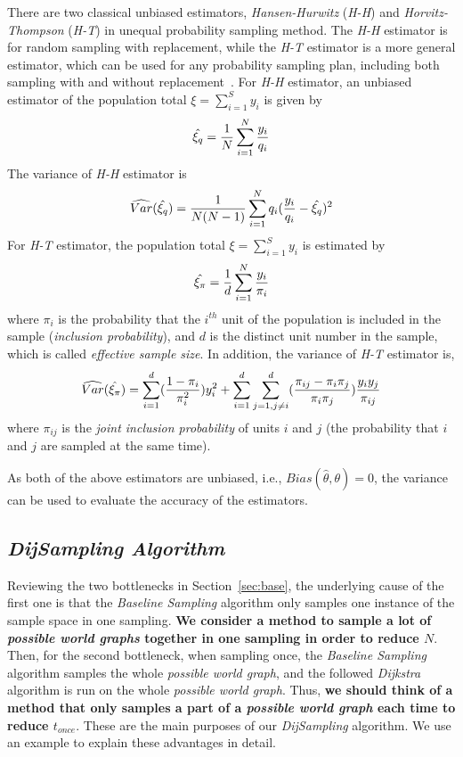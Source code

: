 \documentclass[runningheads,a4paper]{llncs}
\begin{document}
There are two classical unbiased estimators, \emph{Hansen-Hurwitz} (\emph{H-H}) and \emph{Horvitz-Thompson} (\emph{H-T}) in unequal probability sampling method. The \emph{H-H} estimator is for random sampling with replacement, while the \emph{H-T} estimator is a more general estimator, which can be used for any probability sampling plan, including both sampling with and without replacement~\cite{Sampling3rd}. For \emph{H-H} estimator, an unbiased estimator of the population total $\xi=\sum_{i=1}^Sy_i$ is given by
\vspace{-0.3cm}
\[
\hat{\xi_q}=\frac{1}{N}\sum_{i=1}^N\frac{y_i}{q_i}
\vspace{-0.3cm}
\]
The variance of \emph{H-H} estimator is
\vspace{-0.4cm}
\[
\widehat{Var}(\hat{\xi_q})=\frac{1}{N(N-1)}\sum_{i=1}^Nq_i(\frac{y_i}{q_i}-\hat{\xi_q})^2
\vspace{-0.3cm}
\]
For \emph{H-T} estimator, the population total $\xi=\sum_{i=1}^Sy_i$ is estimated by
\vspace{-0.3cm}
\[
\hat{\xi_\pi}=\frac{1}{d}\sum_{i=1}^N\frac{y_i}{\pi_i}
\vspace{-0.3cm}
\]
where $\pi_i$ is the probability that the $i^{th}$ unit of the population is included in the sample (\emph{inclusion probability}), and $d$ is the distinct unit number in the sample, which is called \emph{effective sample size}. In addition, the variance of \emph{H-T} estimator is,
\vspace{-0.3cm}
\[
\widehat{Var}(\hat{\xi_\pi})=\sum_{i=1}^d(\frac{1-\pi_i}{\pi_i^2})y_i^2+\sum_{i=1}^d\sum_{j=1,j\neq i}^d(\frac{\pi_{ij}-\pi_i\pi_j}{\pi_i\pi_j})\frac{y_iy_j}{\pi_{ij}}
\vspace{-0.3cm}
\]
where $\pi_{ij}$ is the \emph{joint inclusion probability} of units $i$ and $j$ (the probability that $i$ and $j$ are sampled at the same time).

As both of the above estimators are unbiased, i.e., $Bias(\widehat{\theta},\theta)=0$, the variance can be used to evaluate the accuracy of the estimators.

\vspace{-0.2cm}
\subsection{\emph{DijSampling Algorithm}}
\label{sec:sec:DijSampling}
\vspace{-0.1cm}

Reviewing the two bottlenecks in Section~\ref{sec:base}, the underlying cause of the first one is that the \emph{Baseline Sampling} algorithm only samples one instance of the sample space in one sampling. \textbf{We consider a method to sample a lot of \emph{possible world graphs} together in one sampling in order to reduce $N$}. Then, for the second bottleneck, when sampling once, the \emph{Baseline Sampling} algorithm samples the whole \emph{possible world graph}, and the followed \emph{Dijkstra} algorithm is run on the whole \emph{possible world graph}. Thus, \textbf{we should think of a method that only samples a part of a \emph{possible world graph} each time to reduce $t_{once}$}. These are the main purposes of our \emph{DijSampling} algorithm. We use an example to explain these advantages in detail.
\end{document}
